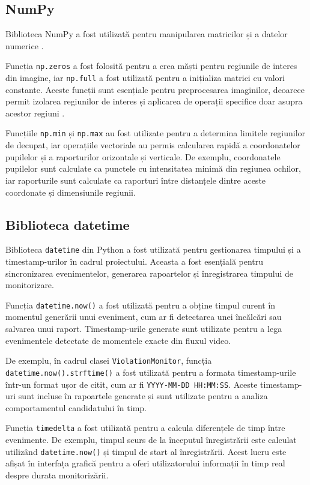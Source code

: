 \documentclass[12pt,a4paper]{article}
\begin{document}
\subsection{NumPy}
Biblioteca NumPy a fost utilizată pentru manipularea matricilor și a datelor numerice \cite{numpy}. 

Funcția \texttt{np.zeros} a fost folosită pentru a crea măști pentru regiunile de interes din imagine, iar \texttt{np.full} a fost utilizată pentru a inițializa matrici cu valori constante. Aceste funcții sunt esențiale pentru preprocesarea imaginilor, deoarece permit izolarea regiunilor de interes și aplicarea de operații specifice doar asupra acestor regiuni \cite{academic3}.

Funcțiile \texttt{np.min} și \texttt{np.max} au fost utilizate pentru a determina limitele regiunilor de decupat, iar operațiile vectoriale au permis calcularea rapidă a coordonatelor pupilelor și a raporturilor orizontale și verticale. De exemplu, coordonatele pupilelor sunt calculate ca punctele cu intensitatea minimă din regiunea ochilor, iar raporturile sunt calculate ca raporturi între distanțele dintre aceste coordonate și dimensiunile regiunii.

\subsection{Biblioteca datetime}
Biblioteca \texttt{datetime}\cite{datetime} din Python a fost utilizată pentru gestionarea timpului și a timestamp-urilor în cadrul proiectului. Aceasta a fost esențială pentru sincronizarea evenimentelor, generarea rapoartelor și înregistrarea timpului de monitorizare.

Funcția \texttt{datetime.now()} a fost utilizată pentru a obține timpul curent în momentul generării unui eveniment, cum ar fi detectarea unei încălcări sau salvarea unui raport. Timestamp-urile generate sunt utilizate pentru a lega evenimentele detectate de momentele exacte din fluxul video.

De exemplu, în cadrul clasei \texttt{ViolationMonitor}, funcția \texttt{datetime.now().strftime()} a fost utilizată pentru a formata timestamp-urile într-un format ușor de citit, cum ar fi \texttt{YYYY-MM-DD HH:MM:SS}. Aceste timestamp-uri sunt incluse în rapoartele generate și sunt utilizate pentru a analiza comportamentul candidatului în timp.

Funcția \texttt{timedelta} a fost utilizată pentru a calcula diferențele de timp între evenimente. De exemplu, timpul scurs de la începutul înregistrării este calculat utilizând \texttt{datetime.now()} și timpul de start al înregistrării. Acest lucru este afișat în interfața grafică pentru a oferi utilizatorului informații în timp real despre durata monitorizării.
\end{document}
